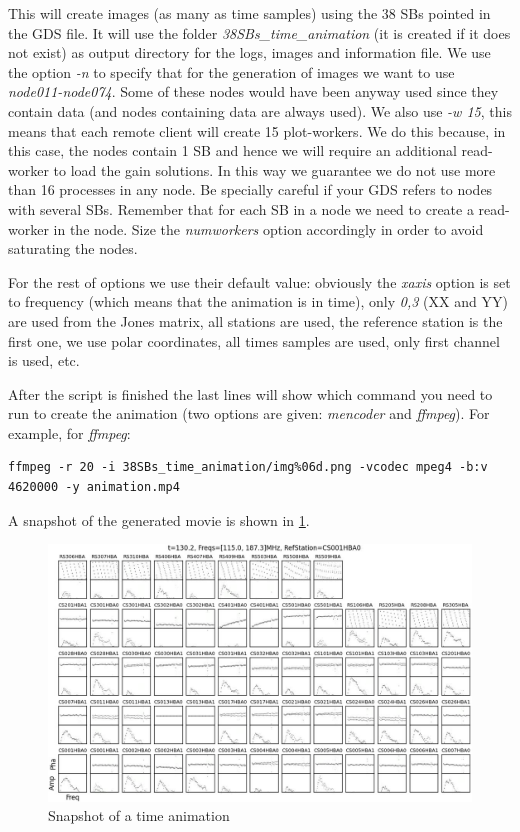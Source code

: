 \documentclass[a4paper,11pt]{article}
\begin{document}
This will create images (as many as time samples) using the 38 SBs pointed in the GDS file. It will use the folder \textit{38SBs\_time\_animation} (it is created if it does not exist) as output directory for the logs, images and information file. We use the option \textit{-n} to specify that for the generation of images we want to use \textit{node011-node074}. Some of these nodes would have been anyway used since they contain data (and nodes containing data are always used). We also use \textit{-w 15}, this means that each remote client will create 15 plot-workers. We do this because, in this case, the nodes contain 1 SB and hence we will require an additional read-worker to load the gain solutions. In this way we guarantee we do not use more than 16 processes in any node. Be specially careful if your GDS refers to nodes with several SBs. Remember that for each SB in a node we need to create a read-worker in the node. Size the \textit{numworkers} option accordingly in order to avoid saturating the nodes. 

For the rest of options we use their default value: obviously the \textit{xaxis} option is set to frequency (which means that the animation is in time), only \textit{0,3} (XX and YY) are used from the Jones matrix, all stations are used, the reference station is the first one, we use polar coordinates, all times samples are used, only first channel is used, etc.

After the script is finished the last lines will show which command you need to run to create the animation (two options are given: \textit{mencoder} and \textit{ffmpeg}). For example, for \textit{ffmpeg}:

\begin{small}
\begin{verbatim}
ffmpeg -r 20 -i 38SBs_time_animation/img%06d.png -vcodec mpeg4 -b:v 4620000 -y animation.mp4
\end{verbatim}
\end{small}

A snapshot of the generated movie is shown in \ref{fig:time}.

\begin{figure}[h]
  \centering
  \includegraphics[scale=0.52]{fig/time} 
  \caption{Snapshot of a time animation}
  \label{fig:time}
\end{figure}
\end{document}
